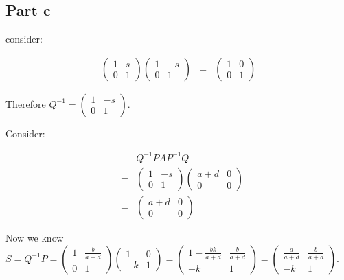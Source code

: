 \subsection*{Part c}
consider:

\begin{eqnarray*}
  \left(\begin{array}{cc}
    1 & s \\
    0 & 1
  \end{array}\right)\left(\begin{array}{cc}
    1 & -s \\
    0 & 1
  \end{array}\right) &=& 
  \left(\begin{array}{cc}
    1 & 0 \\
    0 & 1
  \end{array}\right)
\end{eqnarray*}

Therefore $ Q^{-1} = \left(\begin{array}{cc}
    1 & -s \\
    0 & 1
  \end{array}\right) $. 

Consider:

\begin{eqnarray*}
  & & Q^{-1}PAP^{-1}Q \\
  &=& \left(\begin{array}{cc}
    1 & -s \\
    0 & 1
  \end{array}\right)\left(\begin{array}{cc}
    a+d & 0 \\
    0 & 0
  \end{array}\right) \\
  &=& \left(\begin{array}{cc}
    a+d & 0 \\
    0 & 0
  \end{array}\right)
\end{eqnarray*}

Now we know $ S = Q^{-1}P = \left(\begin{array}{cc}
    1 & \frac{b}{a+d} \\
    0 & 1
  \end{array}\right)\left(\begin{array}{cc}
    1 & 0 \\
    -k & 1
  \end{array}\right) = \left(\begin{array}{cc}
    1-\frac{bk}{a+d} & \frac{b}{a+d} \\
    -k & 1
  \end{array}\right) = \left(\begin{array}{cc}
    \frac{a}{a+d} & \frac{b}{a+d} \\
    -k & 1
  \end{array}\right)$. \\

